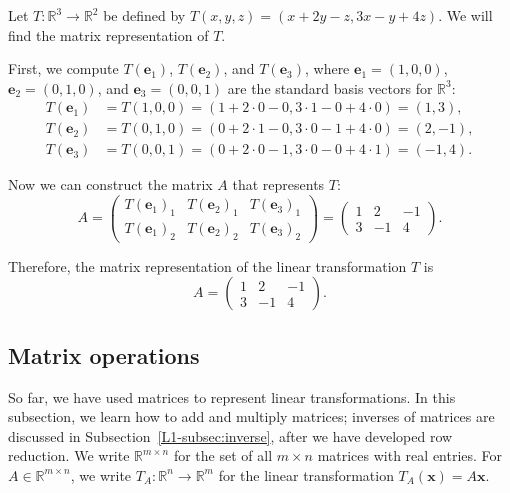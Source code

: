 \begin{example}
    Let $T: \mathbb{R}^3 \to \mathbb{R}^2$ be defined by $T(x, y, z) = (x + 2y - z, 3x - y + 4z)$. We will find the matrix representation of $T$.

    First, we compute $T(\mathbf{e}_1)$, $T(\mathbf{e}_2)$, and $T(\mathbf{e}_3)$, where $\mathbf{e}_1 = (1, 0, 0)$, $\mathbf{e}_2 = (0, 1, 0)$, and $\mathbf{e}_3 = (0, 0, 1)$ are the standard basis vectors for $\mathbb{R}^3$:
    \begin{align*}
        T(\mathbf{e}_1) &= T(1, 0, 0) = (1 + 2 \cdot 0 - 0, 3 \cdot 1 - 0 + 4 \cdot 0) = (1, 3), \\
        T(\mathbf{e}_2) &= T(0, 1, 0) = (0 + 2 \cdot 1 - 0, 3 \cdot 0 - 1 + 4 \cdot 0) = (2, -1), \\
        T(\mathbf{e}_3) &= T(0, 0, 1) = (0 + 2 \cdot 0 - 1, 3 \cdot 0 - 0 + 4 \cdot 1) = (-1, 4).
    \end{align*}

    Now we can construct the matrix $A$ that represents $T$:
    \[A = \begin{pmatrix}
        T(\mathbf{e}_1)_1 & T(\mathbf{e}_2)_1 & T(\mathbf{e}_3)_1 \\
        T(\mathbf{e}_1)_2 & T(\mathbf{e}_2)_2 & T(\mathbf{e}_3)_2
    \end{pmatrix} = \begin{pmatrix}
        1 & 2 & -1 \\
        3 & -1 & 4
    \end{pmatrix}.\]

    Therefore, the matrix representation of the linear transformation $T$ is
    \[A = \begin{pmatrix}
        1 & 2 & -1 \\
        3 & -1 & 4
    \end{pmatrix}.\]
\end{example}

\subsection{Matrix operations}

So far, we have used matrices to represent linear transformations. In this subsection, we learn how to add and multiply matrices; inverses of matrices are discussed in Subsection~\ref{L1-subsec:inverse}, after we have developed row reduction. We write $\mathbb{R}^{m \times n}$ for the set of all $m \times n$ matrices with real entries. For $A \in \mathbb{R}^{m \times n}$, we write $T_A: \mathbb{R}^n \to \mathbb{R}^m$ for the linear transformation $T_A(\mathbf{x}) = A\mathbf{x}$.

